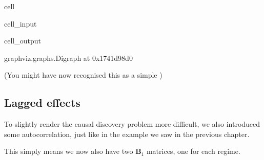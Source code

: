 \documentclass[letterpaper,10pt,english]{jupyterBook}
\begin{document}
\begin{sphinxuseclass}{cell}\begin{sphinxVerbatimInput}

\begin{sphinxuseclass}{cell_input}
\begin{sphinxVerbatim}[commandchars=\\\{\}]
  \PYG{p}{[}\PYG{p}{[}  \PYG{p}{]}
              \PYG{p}{[}  \PYG{p}{]}
              \PYG{p}{[} \PYG{p}{]}\PYG{p}{]}

\end{sphinxVerbatim}

\end{sphinxuseclass}\end{sphinxVerbatimInput}
\begin{sphinxVerbatimOutput}

\begin{sphinxuseclass}{cell_output}
\begin{sphinxVerbatim}[commandchars=\\\{\}]
\PYGZlt{}graphviz.graphs.Digraph at 0x1741d98d0\PYGZgt{}
\end{sphinxVerbatim}

\end{sphinxuseclass}\end{sphinxVerbatimOutput}

\end{sphinxuseclass}
\sphinxAtStartPar
(You might have now recognised this as a simple )


\subsection{Lagged effects}
\label{\detokenize{notebooks/structural_breaks_example:lagged-effects}}
\sphinxAtStartPar
To slightly render the causal discovery problem more difficult, we also introduced some autocorrelation, just like in the  example we saw in the previous chapter.

\sphinxAtStartPar
This simply means we now also have two \(\mathbf{B}_1\) matrices, one for each regime.
\end{document}
